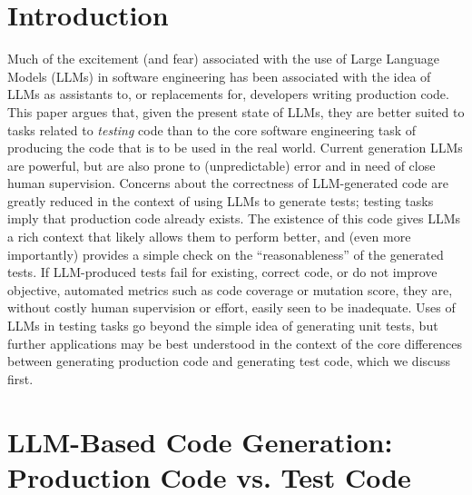 \documentclass[sigconf,natbib=false]{acmart}
\begin{document}


\maketitle

\section{Introduction}

Much of the excitement (and fear) associated with the use of Large
Language Models (LLMs) in software engineering has been associated
with the idea of LLMs as assistants to, or replacements for,
developers writing production code.  This paper argues that, given the
present state of LLMs, they are better suited to tasks related to
\emph{testing} code than to the core software engineering task of
producing the code that is to be used in the real world.  Current
generation LLMs are powerful, but are also prone to (unpredictable)
error and in need of close human supervision.  Concerns about the
correctness of LLM-generated code are greatly reduced in the context
of using LLMs to generate tests; testing tasks imply that production
code already exists.  The existence of this code gives LLMs a rich
context that likely allows them to perform better, and (even more
importantly) provides a simple check on the ``reasonableness'' of the
generated tests.  If LLM-produced tests fail for existing, correct
code, or do not improve objective, automated metrics such as code
coverage or mutation score, they are, without costly human supervision
or effort, easily seen to be inadequate.  Uses of LLMs in testing
tasks go beyond the simple idea of generating unit tests, but further
applications may be best understood in the context of the core
differences between generating production code and generating test
code, which we discuss first.

\section{LLM-Based Code Generation: Production Code vs. Test Code}
\end{document}
